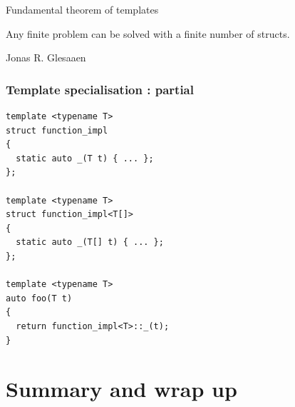 \documentclass[14pt]{beamer}
\begin{document}
\begin{frame}

  \begin{center}\fontsize{16pt}{16pt}\selectfont\color{Tropiteal}
    Fundamental theorem of templates
  \end{center}

  \vspace{.25cm}
  \begin{center}
    \begin{minipage}{8cm}
      Any finite problem can be solved with a finite number of structs.
    \end{minipage}
  \end{center}

  \vspace{.25cm}
  \begin{flushright}\color{ICantExpress!50!WhiteTrash}
    Jonas R. Glesaaen
  \end{flushright}

\end{frame}

\begin{frame}[fragile]
  \frametitle{Template specialisation : partial}

  \begin{lstlisting}[basicstyle=\codefontsize{10pt}]
template <typename T>
struct function_impl
{ 
  static auto _(T t) { ... };
};

template <typename T>
struct function_impl<T[]>
{
  static auto _(T[] t) { ... };
};

template <typename T>
auto foo(T t)
{
  return function_impl<T>::_(t);
}
  \end{lstlisting}

\end{frame}

\section{Summary and wrap up}
\frame{\sectionpage}
\end{document}
